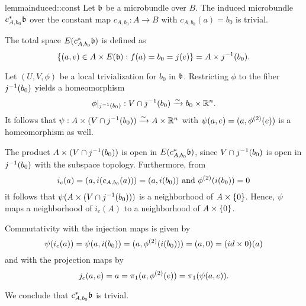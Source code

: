 \begin{mystatement}{lemma}{induced::const}
    Let $\bb$ be a microbundle over $B$.
    The induced microbundle $\ind{c_{A, b_0}}\bb$ over the constant map
    $c_{A, b_0}: A \to B$ with $c_{A, b_0}(a) = b_0$
    is trivial.
\end{mystatement}

\begin{myproof}
    The total space $E(\ind{c_{A, b_0}}\bb)$ is defined as
    \[ \set{(a, e) \in A \cross E(\bb)}{f(a) = b_0 = j(e)} = A \cross \inv{j}(b_0). \]

    Let $(U, V, \phi)$ be a local trivialization for $b_0$ in $\bb$.
    Restricting $\phi$ to the fiber $j^{-1}(b_0)$ yields a homeomorphism
    \[ \phi\vert_{j^{-1}(b_0)}: V \cap j^{-1}(b_0) \xrightarrow{\sim} b_0 \times \mathbb{R}^n. \]
    It follows that $\psi: A \times (V \cap j^{-1}(b_0)) \xrightarrow{\sim} A \times \mathbb{R}^n$ with
    $\psi(a, e) = (a, \phi^{(2)}(e))$
    is a homeomorphism as well.

    The product $A \times (V \cap j^{-1}(b_0))$ is open in $E(\ind{c_{A, b_0}}\bb)$,
    since  $V \cap j^{-1}(b_0)$ is open in $j^{-1}(b_0)$ with the subspace topology.
    Furthermore, from
    \[ i_{c}(a) = (a, i(c_{A, b_0}(a))) = (a, i(b_0)) \text{ and } \phi^{(2)}(i(b_0)) = 0 \]
    it follows that $\psi(A \times (V \cap j^{-1}(b_0)))$ is a neighborhood of $A \times{} \{0\}$.
    Hence, $\psi$ maps a neighborhood of $i_c(A)$
    to a neighborhood of $A \times{} \{0\}$.
    
    Commutativity with the injection maps is given by
    \[ \psi(i_c(a)) = \psi(a, i(b_0)) = (a, \phi^{(2)}(i(b_0))) = (a, 0) = (id \times 0)(a) \]
    and with the projection maps by
    \[ j_c(a, e) = a = \pi_1(a, \phi^{(2)}(e)) = \pi_1(\psi(a, e)). \]

    We conclude that $\ind{c_{A, b_0}}\bb$ is trivial.
\end{myproof}